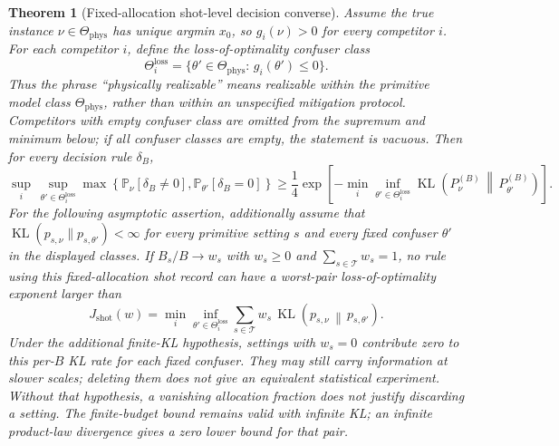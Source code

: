 \documentclass[a4paper,onecolumn,unpublished,nopdfoutputerror]{quantumarticle}
\theoremstyle{plain}
\newtheorem{theorem}{Theorem}[section]
\theoremstyle{definition}
\newcommand{\Prob}{\mathbb{P}}
\newcommand{\1}{\mathbf{1}}
\newcommand{\KL}{\operatorname{KL}}
\begin{document}
\begin{theorem}[Fixed-allocation shot-level decision converse]
\label{thm:shot_level_converse}
Assume the true instance $\nu\in\Theta_{\mathrm{phys}}$ has unique argmin $x_0$,
so $g_i(\nu)>0$ for every competitor $i$.  For each competitor $i$, define the
loss-of-optimality confuser class
\begin{equation}
    \Theta_i^{\mathrm{loss}}
    =\{\theta'\in\Theta_{\mathrm{phys}}:\, g_i(\theta')\le0\}.
\end{equation}
Thus the phrase ``physically realizable'' means realizable within the primitive
model class $\Theta_{\mathrm{phys}}$, rather than within an unspecified mitigation
protocol.  Competitors with empty confuser class are omitted from the supremum
and minimum below; if all confuser classes are empty, the statement is vacuous.
Then for every decision rule $\delta_B$,
\begin{equation}
\label{eq:shot_converse}
    \sup_i\ \sup_{\theta'\in\Theta_i^{\mathrm{loss}}}
    \max\!\left\{
    \Prob_{\nu}[\delta_B\ne0],
    \Prob_{\theta'}[\delta_B=0]
    \right\}
    \ge
    \frac14\exp\!\left[
    -\min_i\inf_{\theta'\in\Theta_i^{\mathrm{loss}}}
    \KL\!\left(P^{(B)}_\nu\,\middle\|\,P^{(B)}_{\theta'}\right)
    \right].
\end{equation}
For the following asymptotic assertion, additionally assume that
$\KL(p_{s,\nu}\|p_{s,\theta'})<\infty$ for every primitive setting $s$ and every fixed
confuser $\theta'$ in the displayed classes. If $B_s/B\to w_s$ with $w_s\ge0$ and
$\sum_{s\in\mathcal T}w_s=1$, no rule using this
fixed-allocation shot record can have a worst-pair loss-of-optimality exponent
larger than
\begin{equation}
\label{eq:shot_exponent}
    J_{\mathrm{shot}}(w)
    =\min_i\inf_{\theta'\in\Theta_i^{\mathrm{loss}}}
    \sum_{s\in\mathcal T}w_s\,
    \KL\!\left(p_{s,\nu}\,\middle\|\,p_{s,\theta'}\right).
\end{equation}
Under the additional finite-KL hypothesis, settings with $w_s=0$ contribute zero
to this per-$B$ KL rate for each fixed confuser. They may still carry information
at slower scales; deleting them does not give an equivalent statistical experiment.
Without that hypothesis, a vanishing allocation fraction does not justify
discarding a setting. The finite-budget bound remains valid with infinite KL;
an infinite product-law divergence gives a zero lower bound for that pair.
\end{theorem}
\end{document}
